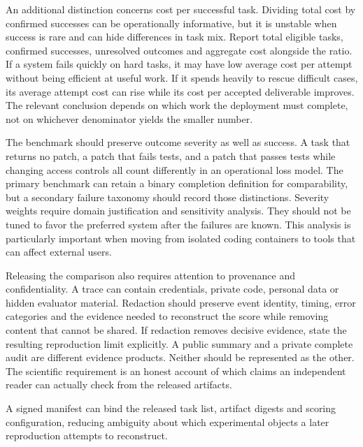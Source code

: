 An additional distinction concerns cost per successful task. Dividing total cost by confirmed successes can be operationally informative, but it is unstable when success is rare and can hide differences in task mix. Report total eligible tasks, confirmed successes, unresolved outcomes and aggregate cost alongside the ratio. If a system fails quickly on hard tasks, it may have low average cost per attempt without being efficient at useful work. If it spends heavily to rescue difficult cases, its average attempt cost can rise while its cost per accepted deliverable improves. The relevant conclusion depends on which work the deployment must complete, not on whichever denominator yields the smaller number.

The benchmark should preserve outcome severity as well as success. A task that returns no patch, a patch that fails tests, and a patch that passes tests while changing access controls all count differently in an operational loss model. The primary benchmark can retain a binary completion definition for comparability, but a secondary failure taxonomy should record those distinctions. Severity weights require domain justification and sensitivity analysis. They should not be tuned to favor the preferred system after the failures are known. This analysis is particularly important when moving from isolated coding containers to tools that can affect external users.

Releasing the comparison also requires attention to provenance and confidentiality. A trace can contain credentials, private code, personal data or hidden evaluator material. Redaction should preserve event identity, timing, error categories and the evidence needed to reconstruct the score while removing content that cannot be shared. If redaction removes decisive evidence, state the resulting reproduction limit explicitly. A public summary and a private complete audit are different evidence products. Neither should be represented as the other. The scientific requirement is an honest account of which claims an independent reader can actually check from the released artifacts.

A signed manifest can bind the released task list, artifact digests and scoring configuration, reducing ambiguity about which experimental objects a later reproduction attempts to reconstruct.
